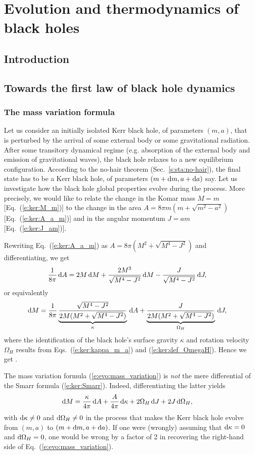 \chapter{Evolution and thermodynamics of black holes}
\label{s:evo}

\minitoc

\section{Introduction}

\section{Towards the first law of black hole dynamics}

\subsection{The mass variation formula}

Let us consider an initially isolated Kerr black hole, of parameters $(m,a)$,
that is perturbed by the arrival of some external body or some gravitational
radiation. After some transitory dynamical regime (e.g. absorption of the
external body and emission of gravitational waves), the black hole relaxes
to a new equilibrium configuration. According to the
no-hair theorem (Sec.~\ref{s:sta:no-hair}),
the final state has to be a Kerr black hole, of
parameters $(m+\mathrm{d} m, a+\mathrm{d} a)$ say.
Let us investigate how the black hole global properties evolve during the
process. More precisely, we would like to relate the change
in the Komar mass $M = m$ [Eq.~(\ref{e:ker:M_m})] to the change in
the area $A = 8 \pi m (m + \sqrt{m^2-a^2})$ [Eq.~(\ref{e:ker:A_a_m})]
and in the angular momentum $J = a m$ [Eq.~(\ref{e:ker:J_am})].

Rewriting Eq.~(\ref{e:ker:A_a_m}) as $A = 8 \pi (M^2 + \sqrt{M^4 - J^2})$
and differentiating, we get
\[
\frac{1}{8\pi} \, \mathrm{d} A =  2 M\,  \mathrm{d} M + \frac{2M^3}{\sqrt{M^4-J^2}}\, \mathrm{d} M
    - \frac{J}{\sqrt{M^4-J^2}}\, \mathrm{d} J ,
\]
or equivalently
\[
    \mathrm{d} M = \frac{1}{8\pi}
\underbrace{\frac{\sqrt{M^4-J^2}}{2M(M^2+\sqrt{M^4-J^2})}}_{\kappa} \, \mathrm{d} A
+ \underbrace{\frac{J}{2M(M^2+\sqrt{M^4-J^2})}}_{\Omega_H} \, \mathrm{d} J  ,
\]
where the identification of the black hole's surface gravity $\kappa$ and
rotation velocity $\Omega_H$ results from Eqs.~(\ref{e:ker:kappa_m_a})
and (\ref{e:ker:def_OmegaH}). Hence we get
\be \label{e:evo:mass_variation}
     .
\ee
\begin{remark}
The mass variation formula (\ref{e:evo:mass_variation}) is \emph{not}
the mere differential of the Smarr formula (\ref{e:ker:Smarr}). Indeed, differentiating
the latter yields
\[
    \mathrm{d} M = \frac{\kappa}{4\pi} \, \mathrm{d} A +  \frac{A}{4\pi} \, \mathrm{d} \kappa
        + 2 \Omega_H \, \mathrm{d} J  + 2 J \, \mathrm{d}\Omega_H ,
\]
with $\mathrm{d}\kappa \neq 0$ and $\mathrm{d}\Omega_H\neq 0$ in the process
that makes the Kerr black hole evolve from $(m,a)$ to $(m+\mathrm{d} m, a+\mathrm{d} a)$.
If one were (wrongly) assuming that $\mathrm{d}\kappa = 0$ and $\mathrm{d}\Omega_H = 0$, one would
be wrong by a factor of 2 in recovering the right-hand side of
Eq.~(\ref{e:evo:mass_variation}).
\end{remark}
